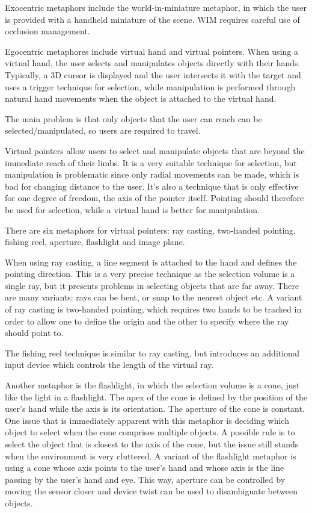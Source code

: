 \documentclass[a4paper]{article}
\begin{document}
Exocentric metaphors include the world-in-miniature metaphor, in which
the user is provided with a handheld miniature of the scene.
WIM
requires careful use of occlusion management.

Egocentric metaphores include virtual hand and virtual pointers.
When
using a virtual hand, the user selects and manipulates objects directly
with their hands.
Typically, a 3D cursor is displayed and the user
intersects it with the target and uses a trigger technique for
selection, while manipulation is performed through natural hand
movements when the object is attached to the virtual hand.

The main problem is that only objects that the user can reach can be
selected/manipulated, so users are required to travel.

Virtual pointers allow users to select and manipulate objects that are
beyond the immediate reach of their limbs.
It is a very suitable
technique for selection, but manipulation is problematic since only
radial movements can be made, which is bad for changing distance to the
user.
It's also a technique that is only effective for one degree of
freedom, the axis of the pointer itself.
Pointing should therefore be
used for selection, while a virtual hand is better for manipulation.

There are six metaphors for virtual pointers: ray casting, two-handed
pointing, fishing reel, aperture, flashlight and image plane.

When using ray casting, a line segment is attached to the hand and
defines the pointing direction.
This is a very precise technique as the
selection volume is a single ray, but it presents problems in selecting
objects that are far away.
There are many variants: rays can be bent, or
snap to the nearest object etc.
A variant of ray casting is two-handed
pointing, which requires two hands to be tracked in order to allow one
to define the origin and the other to specify where the ray should point
to.

The fishing reel technique is similar to ray casting, but introduces an
additional input device which controls the length of the virtual ray.

Another metaphor is the flashlight, in which the selection volume is a
cone, just like the light in a flashlight.
The apex of the cone is
defined by the position of the user's hand while the axis is its
orientation.
The aperture of the cone is constant.
One issue that is
immediately apparent with this metaphor is deciding which object to
select when the cone comprises multiple objects.
A possible rule is to
select the object that is closest to the axis of the cone, but the issue
still stands when the environment is very cluttered.
A variant of the
flashlight metaphor is using a cone whose axis points to the user's hand
and whose axis is the line passing by the user's hand and eye.
This way,
aperture can be controlled by moving the sensor closer and device twist
can be used to disambiguate between objects.
\end{document}
